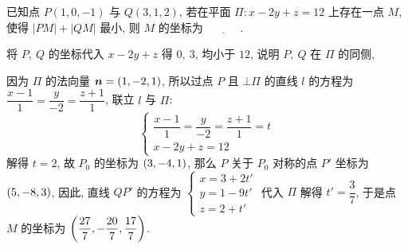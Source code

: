 \begin{example}
    已知点 $P(1,0,-1)$ 与 $Q(3,1,2)$, 若在平面 $\varPi:x-2y+z=12$ 上存在一点 $M$, 使得 $|PM|+|QM|$ 最小, 则 $M$ 的坐标为 $\underline{\quad\quad\quad}.$
\end{example}
\begin{solution}
    将 $P,~Q$ 的坐标代入 $x-2y+z$ 得 $0,~3$, 均小于 $12$, 说明 $P,~Q$ 在 $\varPi$ 的同侧,
    \begin{multicols}{2}
         因为 $\varPi$ 的法向量 $\vb*{n}=\qty(1,-2,1)$, 所以过点 $P$ 且 $\bot \varPi$ 的直线 $l$ 的方程为 $\dfrac{x-1}{1}=\dfrac{y}{-2}=\dfrac{z+1}{1}$, 联立 $l$ 与 $\varPi$:$$
        \begin{cases}
            \dfrac{x-1}{1}=\dfrac{y}{-2}=\dfrac{z+1}{1}=t \\ 
            x-2y+z=12
        \end{cases}
        $$
        解得 $t=2$, 故 $P_0$ 的坐标为 $\qty(3,-4,1)$, 那么 $P$ 关于 $P_0$ 对称的点 $P'$ 坐标为 $\qty(5,-8,3)$, 因此, 直线 $QP'$ 的方程为 $\begin{cases}
            x=3+2t'\\ y=1-9t'\\ z=2+t'
        \end{cases}$
        代入 $\varPi$ 解得 $t'=\dfrac{3}{7}$, 于是点 $M$ 的坐标为 $\qty(\dfrac{27}{7},-\dfrac{20}{7},\dfrac{17}{7})$.
    \begin{figure}[H]
        \centering
        


\begin{tikzpicture}[x=0.75pt,y=0.75pt,yscale=-1,xscale=1]


\end{tikzpicture}
\end{figure}
\end{multicols}
\end{solution}
